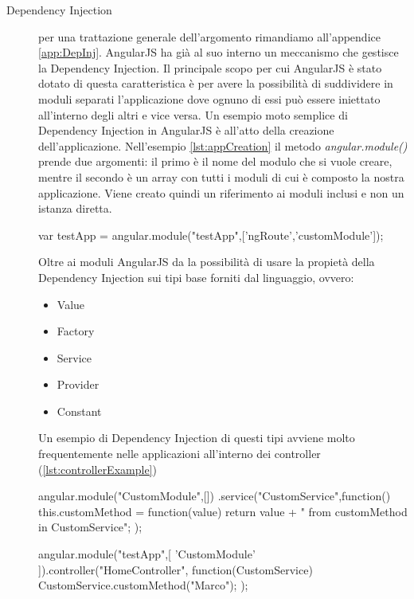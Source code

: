 \begin{description}
\item[Dependency Injection] per una trattazione generale dell'argomento rimandiamo all'appendice \ref{app:DepInj}. AngularJS ha già al suo interno un meccanismo che gestisce la Dependency Injection. Il principale scopo per cui AngularJS è stato dotato di questa caratteristica è per avere la possibilità di suddividere in moduli separati l'applicazione dove ognuno di essi può essere iniettato all'interno degli altri e vice versa. Un esempio moto semplice di Dependency Injection in AngularJS è all'atto della creazione dell'applicazione. Nell'esempio \ref{lst:appCreation} il metodo \textit{angular.module()} prende due argomenti: il primo è il nome del modulo che si vuole creare, mentre il secondo è un array con tutti i moduli di cui è composto la nostra applicazione. Viene creato quindi un riferimento ai moduli inclusi e non un istanza diretta.  

\begin{code}[caption = {Creazione di una applicazione in AngularJS con le relative dipendenze}, 
				   label = {lst:appCreation}]
	var testApp = angular.module("testApp",['ngRoute','customModule']);
\end{code}

Oltre ai moduli AngularJS da la possibilità di usare la propietà della Dependency Injection sui tipi base forniti dal linguaggio, ovvero:

\begin{itemize}
\item Value
\item Factory
\item Service
\item Provider
\item Constant
\end{itemize}

Un esempio di Dependency Injection di questi tipi avviene molto frequentemente nelle applicazioni all'interno dei controller (\ref{lst:controllerExample})

\begin{code}[caption = {Un esempio di creazione di un modulo e la sua inclusione all'interno di un altro}, 
				   label = {lst:controllerExample}]

angular.module("CustomModule",[])
.service("CustomService",function(){
	this.customMethod = function(value){
		return value + " from customMethod in CustomService";	
	}
});

angular.module("testApp",[
	'CustomModule'
]).controller("HomeController", function(CustomService){
	CustomService.customMethod("Marco");
});


\end{code}
\end{description}
